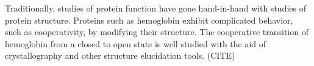 \documentclass[../AdvancementSummary.tex]{subfiles}
\begin{document}
%
%
%
%
%


%
%


Traditionally, studies of protein function have gone hand-in-hand with studies of protein structure. Proteins such as hemoglobin exhibit complicated behavior, such as cooperativity, by modifying their structure. The cooperative transition of hemoglobin from a closed to open state is well studied with the aid of crystallography and other structure elucidation tools. (CITE)
\end{document}
